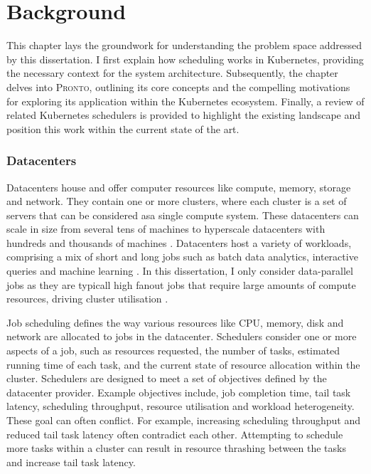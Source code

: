\chapter{Background}

%
%
This chapter lays the groundwork for understanding the problem space addressed
by this dissertation. I first explain how scheduling works in Kubernetes,
providing the necessary context for the system architecture. Subsequently, the
chapter delves into \textsc{Pronto}, outlining its core concepts and the
compelling motivations for exploring its application within the Kubernetes
ecosystem. Finally, a review of related Kubernetes schedulers is provided to
highlight the existing landscape and position this work within the current state
of the art.

\subsection{Datacenters}
Datacenters house and offer computer resources like compute, memory, storage and
network. They contain one or more clusters, where each cluster is a set of
servers that can be considered asa  single compute system. These datacenters can
scale in size from several tens of machines to hyperscale datacenters with
hundreds and thousands of machines \cite{27,107}. Datacenters host a variety of
workloads, comprising a mix of short and long jobs such as batch data analytics,
interactive queries and machine learning \cite{27}. In this dissertation, I
only consider data-parallel jobs as they are typicall high fanout jobs that
require large amounts of compute resources, driving cluster utilisation
\cite{6}.

Job scheduling defines the way various resources like CPU, memory, disk and
network are allocated to jobs in the datacenter. Schedulers consider one or more
aspects of a job, such as resources requested, the number of tasks, estimated
running time of each task, and the current state of resource allocation within
the cluster. Schedulers are designed to meet a set of objectives defined by the
datacenter provider. Example objectives include, job completion time, tail task
latency, scheduling throughput, resource utilisation and workload heterogeneity.
These goal can often conflict. For example, increasing scheduling throughput and
reduced tail task latency often contradict each other. Attempting to schedule
more tasks within a cluster can result in resource thrashing between the tasks
and increase tail task latency.

